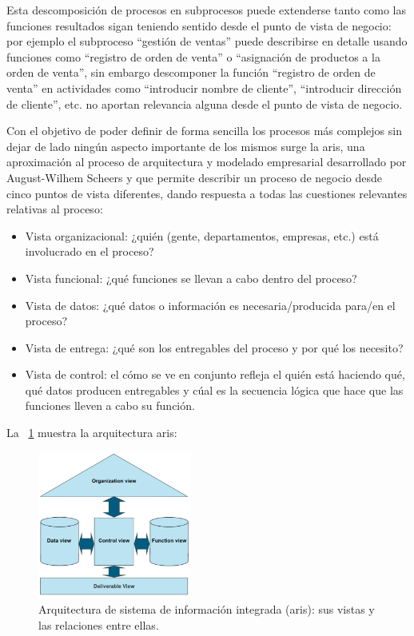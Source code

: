 Esta descomposición de procesos en subprocesos puede extenderse tanto
como las funciones resultados sigan teniendo sentido desde el punto de
vista de negocio: por ejemplo el subproceso ``gestión de ventas'' puede describirse en detalle usando funciones como ``registro de orden de venta'' o ``asignación de productos a la orden de venta'', sin embargo descomponer la función ``registro de orden de venta'' en actividades como ``introducir nombre de cliente'', ``introducir dirección de cliente'', etc. no aportan relevancia alguna desde el punto de vista de negocio.

Con el objetivo de poder definir de forma sencilla los procesos más complejos sin dejar de lado ningún aspecto importante de los mismos surge la \acrfull{aris}, una aproximación al proceso de arquitectura y modelado empresarial desarrollado por August-Wilhem Scheers y que permite describir un proceso de negocio desde cinco puntos de vista diferentes, dando respuesta a todas las cuestiones relevantes relativas al proceso:
\begin{itemize}
\item Vista organizacional: ¿quién (gente, departamentos, empresas, etc.) está involucrado en el proceso?
\item Vista funcional: ¿qué funciones se llevan a cabo dentro del proceso?
\item Vista de datos: ¿qué datos o información es necesaria/producida para/en el proceso?
\item Vista de entrega: ¿qué son los entregables del proceso y por qué los necesito?
\item Vista de control: el cómo se ve en conjunto refleja el quién está haciendo qué, qué datos producen entregables y cúal es la secuencia lógica que hace que las funciones lleven a cabo su función.
\end{itemize}


La \figurename~\ref{fig:aris} muestra la arquitectura \acrshort{aris}:

\begin{figure}[H]
  \centering
  \includegraphics[width=0.45\textwidth]{imaxes/aris.png}
  \caption{Arquitectura de sistema de información integrada (\acrshort{aris}): sus vistas y las relaciones entre ellas.}
  \label{fig:aris}
\end{figure}


